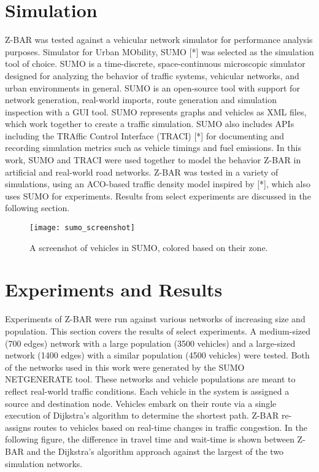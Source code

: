 \documentclass[conference]{IEEEtran}
\begin{document}
\section{Simulation}

Z-BAR was tested against a vehicular network simulator for performance analysis purposes. Simulator for Urban MObility, SUMO [*] was selected as the simulation tool of choice. SUMO is a time-discrete, space-continuous microscopic simulator designed for analyzing the behavior of traffic systems, vehicular networks, and urban environments in general. SUMO is an open-source tool with support for network generation, real-world imports, route generation and simulation inspection with a GUI tool. SUMO represents graphs and vehicles as XML files, which work together to create a traffic simulation. SUMO also includes APIs including the TRAffic Control Interface (TRACI) [*] for documenting and recording simulation metrics such as vehicle timings and fuel emissions. In this work, SUMO and TRACI were used together to model the behavior Z-BAR in artificial and real-world road networks. Z-BAR was tested in a variety of simulations, using an ACO-based traffic density model inspired by [*], which also uses SUMO for experiments. Results from select experiments are discussed in the following section.

\begin{figure}[h]
\caption{A screenshot of vehicles in SUMO, colored based on their zone.}
\centering
\texttt{[image: sumo\_screenshot]}
\end{figure}

\section{Experiments and Results} %

Experiments of Z-BAR were run against various networks of increasing size and population. This section covers the results of select experiments. A medium-sized (700 edges) network with a large population (3500 vehicles) and a large-sized network (1400 edges) with a similar population (4500 vehicles) were tested. Both of the networks used in this work were generated by the SUMO NETGENERATE tool. These networks and vehicle populations are meant to reflect real-world traffic conditions. Each vehicle in the system is assigned a source and destination node. Vehicles embark on their route via a single execution of Dijkstra's algorithm to determine the shortest path. Z-BAR re-assigns routes to vehicles based on real-time changes in traffic congestion. In the following figure, the difference in travel time and wait-time is shown between Z-BAR and the Dijkstra's algorithm approach against the largest of the two simulation networks.
\end{document}
